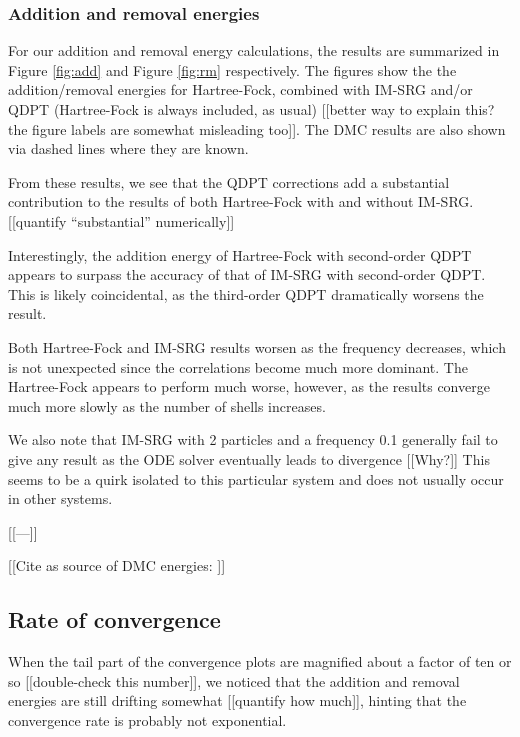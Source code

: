 \subsubsection{Addition and removal energies}

For our addition and removal energy calculations, the results are summarized in Figure \ref{fig:add} and Figure \ref{fig:rm} respectively.  The figures show the the addition/removal energies for Hartree-Fock, combined with IM-SRG and/or QDPT (Hartree-Fock is always included, as usual) [[better way to explain this? the figure labels are somewhat misleading too]].  The DMC results are also shown via dashed lines where they are known.

From these results, we see that the QDPT corrections add a substantial contribution to the results of both Hartree-Fock with and without IM-SRG.  [[quantify ``substantial'' numerically]]

Interestingly, the addition energy of Hartree-Fock with second-order QDPT appears to surpass the accuracy of that of IM-SRG with second-order QDPT.  This is likely coincidental, as the third-order QDPT dramatically worsens the result.

Both Hartree-Fock and IM-SRG results worsen as the frequency decreases, which is not unexpected since the correlations become much more dominant.  The Hartree-Fock appears to perform much worse, however, as the results converge much more slowly as the number of shells increases.

We also note that IM-SRG with 2 particles and a frequency 0.1 generally fail to give any result as the ODE solver eventually leads to divergence [[Why?]]  This seems to be a quirk isolated to this particular system and does not usually occur in other systems.

[[---]]

[[Cite as source of DMC energies: \cite{PhysRevB.84.115302}]]

\subsection{Rate of convergence}

When the tail part of the convergence plots are magnified about a factor of ten or so [[double-check this number]], we noticed that the addition and removal energies are still drifting somewhat [[quantify how much]], hinting that the convergence rate is probably not exponential.

